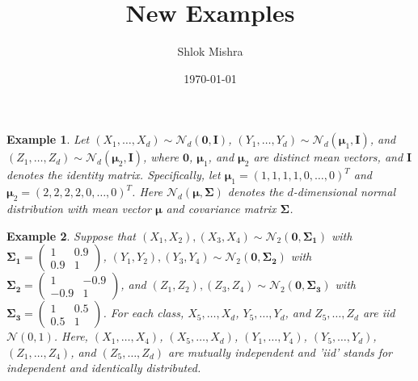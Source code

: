 \documentclass[12pt]{article}
\title{\textbf{New Examples}}
\author{Shlok Mishra}
\date{\today}
\newtheorem{example}{Example}
\begin{document}
\maketitle

\begin{example}\label{ex2}
    Let \( (X_1, \ldots, X_{d}) \sim \mathcal{N}_{d}(\mathbf{0},\mathbf{I}) \), \( (Y_1, \ldots, Y_{d}) \sim \mathcal{N}_{d}(\boldsymbol{\mu}_1,\mathbf{I}) \), and \( (Z_1, \ldots, Z_{d}) \sim \mathcal{N}_{d}(\boldsymbol{\mu}_2,\mathbf{I}) \), where \(\mathbf{0}\), \(\boldsymbol{\mu}_1\), and \(\boldsymbol{\mu}_2\) are distinct mean vectors, and \(\mathbf{I}\) denotes the identity matrix. Specifically, let \(\boldsymbol{\mu}_1 = (1,1,1,1,0,\ldots,0)^T\) and \(\boldsymbol{\mu}_2 = (2,2,2,2,0,\ldots,0)^T\). Here \(\mathcal{N}_{d}(\boldsymbol{\mu}, \mathbf{\Sigma})\) denotes the \(d\)-dimensional normal distribution with mean vector \(\boldsymbol{\mu}\) and covariance matrix \(\mathbf{\Sigma}\).
\end{example}

\begin{example}\label{ex2}
    Suppose that \((X_1, X_2), (X_3, X_4) \sim \mathcal{N}_{2}(\mathbf{0}, \mathbf{\Sigma_1})\) with \(\mathbf{\Sigma_1} = \begin{pmatrix} 1 & 0.9 \\ 0.9 & 1 \end{pmatrix}\), \((Y_1, Y_2), (Y_3, Y_4) \sim \mathcal{N}_{2}(\mathbf{0}, \mathbf{\Sigma_2})\) with \(\mathbf{\Sigma_2} = \begin{pmatrix} 1 & -0.9 \\ -0.9 & 1 \end{pmatrix}\), and \((Z_1, Z_2), (Z_3, Z_4) \sim \mathcal{N}_{2}(\mathbf{0}, \mathbf{\Sigma_3})\) with \(\mathbf{\Sigma_3} = \begin{pmatrix} 1 & 0.5 \\ 0.5 & 1 \end{pmatrix}\). For each class, \(X_5, \ldots, X_{d}\), \(Y_5, \ldots, Y_{d}\), and \(Z_5, \ldots, Z_{d}\) are \textit{iid} \(\mathcal{N}(0,1)\). Here, \((X_1, \ldots, X_4)\), \((X_5, \ldots, X_{d})\), \((Y_1, \ldots, Y_{4})\), \((Y_5, \ldots, Y_{d})\), \((Z_1, \ldots, Z_{4})\), and \((Z_5, \ldots, Z_{d})\) are mutually independent and \textit{'iid'} stands for independent and identically distributed.
\end{example}
\end{document}
